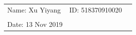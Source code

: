 \documentclass{article}
\begin{document}
\hrulefill
\thispagestyle{empty}



\begin{center}

\begin{large}


\end{large}



\hrulefill



\vspace*{5cm}

\begin{Large}


\end{Large}



\vspace{2em}



\begin{large}


\end{large}

\end{center}





\vfill



\begin{table}[h!]

\flushleft

\begin{tabular}{lll}

Name: Xu Yiyang \hspace*{2em}&

ID: 518370910020\hspace*{2em}\\





\\



Date: 13 Nov 2019 



\end{tabular}

\end{table}
\end{document}

